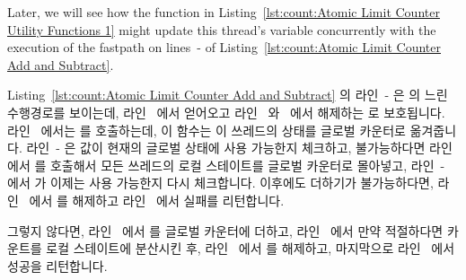 \begin{lineref}
{\begin{lineref}
	Later, we will see how the  function in
	Listing~\ref{lst:count:Atomic Limit Counter Utility Functions 1}
	might update this thread's  variable concurrently
	with the execution of the fastpath on
        lines~- of
	Listing~\ref{lst:count:Atomic Limit Counter Add and Subtract}.
	\fi
	\end{lineref}
} \QuickQuizEnd

\begin{lineref}
Listing~\ref{lst:count:Atomic Limit Counter Add and Subtract} 의
라인~- 은
 의 느린 수행경로를 보이는데, 라인~ 에서
얻어오고 라인~ 와~ 에서 해제하는
 로 보호됩니다.
라인~ 에서는  를 호출하는데, 이 함수는
이 쓰레드의 상태를 글로벌 카운터로 옮겨줍니다.
라인~- 은  값이 현재의 글로벌
상태에 사용 가능한지 체크하고, 불가능하다면 라인~ 에서
 를 호출해서 모든 쓰레드의 로컬 스테이트를 글로벌
카운터로 몰아넣고, 라인~- 에서 
가 이제는 사용 가능한지 다시 체크합니다.
이후에도  더하기가 불가능하다면, 라인~ 에서
 를 해제하고 라인~ 에서 실패를 리턴합니다.

그렇지 않다면, 라인~ 에서  를 글로벌 카운터에 더하고,
라인~ 에서 만약 적절하다면 카운트를 로컬 스테이트에 분산시킨 후,
라인~ 에서  를 해제하고, 마지막으로
라인~ 에서 성공을 리턴합니다.
\iffalse


\end{lineref}
\end{lineref}
